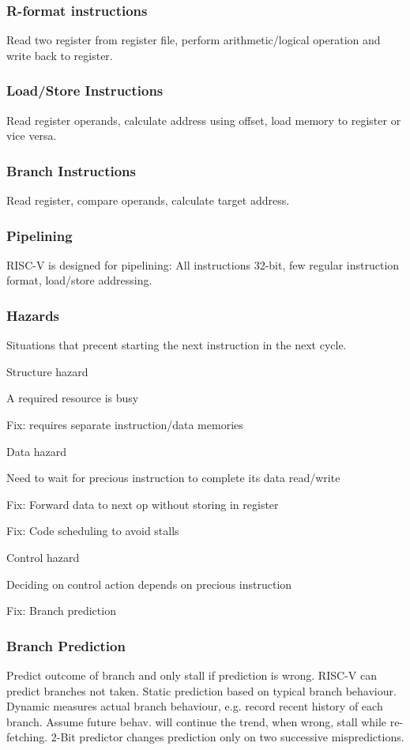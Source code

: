 \documentclass[a4paper, fontsize=8pt, landscape, DIV=1]{scrartcl}
\makeatletter
\renewenvironment{outline}[1][]{%
  \ifthenelse{\equal{#1}{}}{}{\renewcommand{\ol@type}{#1}}%
  \ol@z%
  \newcommand{\0}{\ol@toz\ol@z}%
  \newcommand{\1}{\vspace{\dimexpr\outlinespacingscalar\baselineskip-\baselineskip}\ol@toi\ol@i\item}%
  \newcommand{\2}{\vspace{\dimexpr\outlinespacingscalartwo\baselineskip-\baselineskip}\ol@toii\ol@ii\item}%
  \newcommand{\3}{\vspace{\dimexpr\outlinespacingscalar\baselineskip-\baselineskip}\ol@toiii\ol@iii\item}%
  \newcommand{\4}{\vspace{\dimexpr\outlinespacingscalar\baselineskip-\baselineskip}\ol@toiiii\ol@iiii\item}%
}{%
  \ol@toz\ol@exit%
}
\def\outlinespacingscalar{0.5}
\def\outlinespacingscalartwo{0.5}
\makeatother
\begin{document}
\begin{multicols*}{4}
  \subsubsection{R-format instructions}
  Read two register from register file, perform arithmetic/logical operation and
  write back to register.

  \subsubsection{Load/Store Instructions}
  Read register operands, calculate address using offset, load memory to register
  or vice versa.

  \subsubsection{Branch Instructions}
  Read register, compare operands, calculate target address.

  \subsubsection{Pipelining}
  RISC-V is designed for pipelining: All instructions 32-bit, few regular instruction
  format, load/store addressing.

  \subsubsection{Hazards}
  Situations that precent starting the next instruction in the next cycle.
  \begin{outline}
    \1 Structure hazard
      \2 A required resource is busy
      \2 Fix: requires separate instruction/data memories
    \1 Data hazard
      \2 Need to wait for precious instruction to complete its data read/write
      \2 Fix: Forward data to next op without storing in register
      \2 Fix: Code scheduling to avoid stalls
    \1 Control hazard
      \2 Deciding on control action depends on precious instruction
      \2 Fix: Branch prediction
  \end{outline}

  \subsubsection{Branch Prediction}
  Predict outcome of branch and only stall if prediction is wrong. RISC-V can predict branches
  not taken. Static prediction based on typical branch behaviour. Dynamic measures actual branch
  behaviour, e.g. record recent history of each branch. Assume future behav. will continue the trend,
  when wrong, stall while re-fetching. 2-Bit predictor changes prediction only on two successive
  mispredictions.


\end{multicols*}
\end{document}
